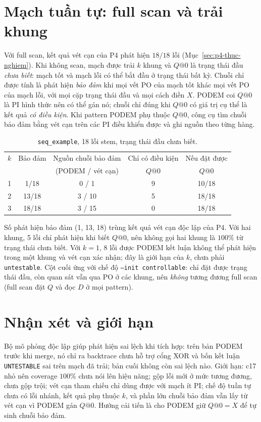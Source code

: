 \section{Mạch tuần tự: full scan và trải khung}
\label{sec:p6-tuan-tu}
Với full scan, kết quả vét cạn của P4 phát hiện $18/18$ lỗi
(Mục~\ref{sec:p4-thuc-nghiem}). Khi không scan, mạch được trải $k$ khung và
$Q@0$ là trạng thái đầu \emph{chưa biết}: mạch tốt và mạch lỗi có thể bắt đầu ở
trạng thái bất kỳ. Chuỗi chỉ được tính là phát hiện \emph{bảo đảm} khi mọi vết
PO của mạch tốt khác mọi vết PO của mạch lỗi, với mọi cặp trạng thái đầu và mọi
cách điền $X$. PODEM coi $Q@0$ là PI hình thức nên có thể gán nó; chuỗi chỉ
đúng khi $Q@0$ có giá trị cụ thể là kết quả \emph{có điều kiện}. Khi pattern
PODEM phụ thuộc $Q@0$, công cụ tìm chuỗi bảo đảm bằng vét cạn trên các PI điều
khiển được và ghi nguồn theo từng hàng.
\begin{table}[H]
\centering
\caption{\texttt{seq\_example}, 18 lỗi stem, trạng thái đầu chưa biết.}
\label{tab:p6-seq}
\begin{tabular}{@{}ccccc@{}}
\toprule
$k$ & Bảo đảm & Nguồn chuỗi bảo đảm & Chỉ có điều kiện & Nếu đặt được\\
 & & (PODEM / vét cạn) & $Q@0$ & $Q@0$\\
\midrule
1 & 1/18 & 0 / 1 & 9 & 10/18\\
2 & 13/18 & 3 / 10 & 5 & 18/18\\
3 & 18/18 & 3 / 15 & 0 & 18/18\\
\bottomrule
\end{tabular}
\end{table}
Số phát hiện bảo đảm (1, 13, 18) trùng kết quả vét cạn độc lập của P4. Với hai
khung, 5 lỗi chỉ phát hiện khi biết $Q@0$, nên không gọi hai khung là $100\%$ từ
trạng thái chưa biết. Với $k=1$, 8 lỗi được PODEM kết luận không thể phát hiện
trong một khung và vét cạn xác nhận; đây là giới hạn của $k$, chưa phải
\texttt{untestable}. Cột cuối ứng với chế độ \texttt{--init controllable}: chỉ
đặt được trạng thái đầu, còn quan sát vẫn qua PO ở các khung, nên \emph{không}
tương đương full scan (full scan đặt $Q$ và đọc $D$ ở mọi pattern).

\section{Nhận xét và giới hạn}
\label{sec:p6-nhan-xet}
Bộ mô phỏng độc lập giúp phát hiện sai lệch khi tích hợp: trên bản PODEM trước
khi merge, nó chỉ ra backtrace chưa hỗ trợ cổng XOR và bốn kết luận
\texttt{UNTESTABLE} sai trên mạch đã trải; bản cuối không còn sai lệch nào.
Giới hạn: c17 nhỏ nên coverage $100\%$ chưa nói lên hiệu năng; gộp lỗi mới ở
mức tương đương, chưa gộp trội; vét cạn tham chiếu chỉ dùng được với mạch ít
PI; chế độ tuần tự chưa có lỗi nhánh, kết quả phụ thuộc $k$, và phần lớn chuỗi
bảo đảm vẫn lấy từ vét cạn vì PODEM gán $Q@0$. Hướng cải tiến là cho PODEM giữ
$Q@0=X$ để tự sinh chuỗi bảo đảm.
